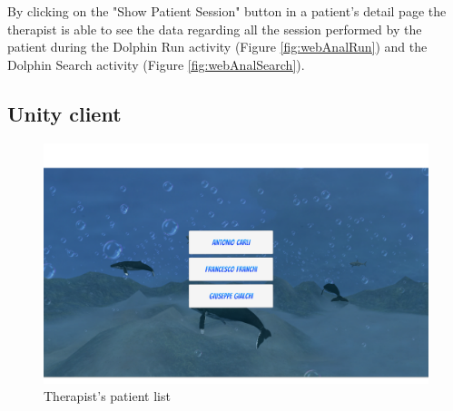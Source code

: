 
By clicking on the "Show Patient Session" button in a patient's detail page the therapist is able to see the data regarding all the session performed by the patient during the Dolphin Run activity (Figure \ref{fig:webAnalRun}) and the Dolphin Search activity (Figure \ref{fig:webAnalSearch}).



\subsection{Unity client}
\begin{figure}[h!]
	\includegraphics[width=\textwidth]{images/UX/unity/menu/3-patientList}
	\caption{Therapist's patient list}
	\label{fig:unityPatList}
\end{figure}

